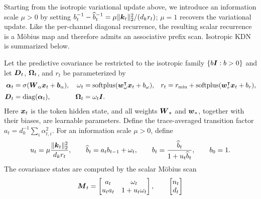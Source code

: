 \documentclass[11pt,letterpaper,logo]{yalearxiv}
\begin{document}
Starting from the isotropic variational update above, we introduce an information scale $\mu>0$
by setting
$b_t^{-1}-\widehat b_t^{-1}=\mu\|\boldsymbol{k}_t\|_2^2/(d_k r_t)$; $\mu=1$ recovers the
variational update.
Like the per-channel diagonal recurrence, the resulting scalar recurrence is a M\"obius map and
therefore admits an associative prefix scan. Isotropic KDN is summarized below.

\label{prop:isotropic-kalman-linear-attention}
\begin{tcolorbox}[
  title={Proposition~\thedefinition: Isotropic Kalman Delta Network},
  breakable,
  colback=blue!7,
  colbacktitle=blue!22,
  colframe=blue!45!black,
  coltitle=black,
  fonttitle=\bfseries,
  boxrule=0.4pt,
  arc=1pt,
  left=5pt,
  right=5pt,
  top=5pt,
  bottom=5pt
]
Let the predictive covariance be restricted to the isotropic family
$\{b\boldsymbol{I}:b>0\}$ and let
$\boldsymbol{D}_t$, $\boldsymbol{\Omega}_t$, and $r_t$ be parameterized by
\begin{equation}
\begin{aligned}
  \boldsymbol{\alpha}_t &= \sigma(\boldsymbol{W}_{\alpha}\boldsymbol{x}_t+\boldsymbol{b}_{\alpha}),
  &
  \omega_t &= \operatorname{softplus}(\boldsymbol{w}_{\omega}^{\intercal}\boldsymbol{x}_t+b_\omega),
  &
  r_t &= r_{\min}+\operatorname{softplus}(\boldsymbol{w}_{r}^{\intercal}\boldsymbol{x}_t+b_r),
  \\[2pt]
  \boldsymbol{D}_t &= \operatorname{diag}(\boldsymbol{\alpha}_t),
  &
  \boldsymbol{\Omega}_t &= \omega_t\boldsymbol{I}.
\end{aligned}
\label{eq:iso-kla-box-parameterization}
\end{equation}
Here $\boldsymbol{x}_t$ is the token hidden state, and all weights $\boldsymbol{W}_{\ast}$ and
$\boldsymbol{w}_{\ast}$, together with their biases, are learnable parameters.
Define the trace-averaged transition factor
$a_t=d_k^{-1}\sum_i\alpha_{t,i}^2$.
For an information scale $\mu>0$, define
\begin{equation}
  u_t=\mu\frac{\|\boldsymbol{k}_t\|_2^2}{d_k r_t},
  \qquad
  \widehat b_t
  =a_tb_{t-1}+\omega_t,
  \qquad
  b_t
  =\frac{\widehat b_t}{1+u_t\widehat b_t},
  \qquad b_0=1.
  \label{eq:iso-kla-box-cov-update}
\end{equation}
The covariance states are computed by the scalar M\"obius scan
\begin{equation}
  \ve{M}_t=
  \begin{bmatrix}
    a_t & \omega_t\\
    u_ta_t & 1+u_t\omega_t
  \end{bmatrix},
  \qquad
  \begin{bmatrix}n_t\\ d_t\end{bmatrix}

\end{equation}
\end{tcolorbox}
\end{document}
